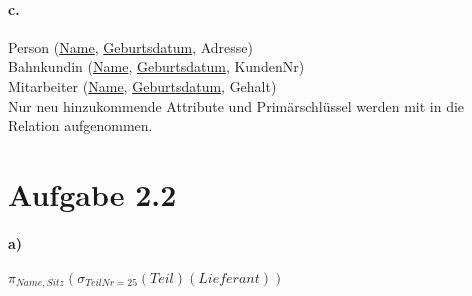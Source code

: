\documentclass[12pt]{article}
\begin{document}
			
			
		\paragraph*{c.}
			Person (\underline{Name}, \underline{Geburtsdatum}, Adresse) \\[1,3em]
			
			Bahnkundin (\underline{Name}, \underline{Geburtsdatum}, KundenNr) \\[1,3em]
			
			Mitarbeiter (\underline{Name}, \underline{Geburtsdatum}, Gehalt) \\[1,3em]
		
			Nur neu hinzukommende Attribute und Primärschlüssel werden mit in die Relation aufgenommen.
	
	\newpage	
	\section*{Aufgabe 2.2}
	
		\paragraph*{a)}
			$\pi_{Name, Sitz}(\sigma_{TeilNr=25}(Teil)(Lieferant))$
	
		
\end{document}
